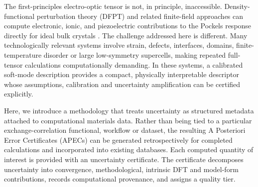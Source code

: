 \documentclass[twocolumn,superscriptaddress,amsmath,amssymb,longbibliography]{revtex4-2}
\begin{document}
The first-principles electro-optic tensor is not, in principle, inaccessible.
Density-functional perturbation theory (DFPT) and related
finite-field approaches can compute electronic, ionic, and piezoelectric
contributions to the Pockels response directly for ideal bulk crystals
\cite{Veithen2005,Veithen2004_PRL}. The challenge addressed here
is different. Many technologically relevant systems involve strain, defects, interfaces, domains, finite-temperature disorder or large low-symmetry supercells, making repeated full-tensor calculations computationally demanding. In these systems, a calibrated soft-mode description provides a compact, physically interpretable descriptor whose assumptions, calibration and uncertainty amplification can be certified explicitly.

Here, we introduce a methodology that treats uncertainty as structured metadata attached to computational materials data. Rather than being tied to a particular exchange-correlation functional, workflow or dataset, the resulting A Posteriori Error Certificates (APECs) can be generated retrospectively for completed calculations and incorporated into existing databases. Each computed quantity of interest is provided with an uncertainty certificate. The certificate decomposes uncertainty into convergence, methodological, intrinsic DFT and model-form contributions, records computational provenance, and assigns a quality tier.
\end{document}
